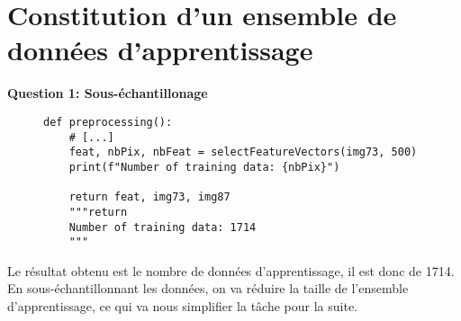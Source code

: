 \section{Constitution d’un ensemble de données d’apprentissage}

\textbf{Question 1: Sous-échantillonage}

\begin{figure}[!h]
    \begin{verbatim}
def preprocessing():
    # [...]
    feat, nbPix, nbFeat = selectFeatureVectors(img73, 500)
    print(f"Number of training data: {nbPix}")
    
    return feat, img73, img87
    """return
    Number of training data: 1714 
    """
    \end{verbatim}   
\end{figure}

Le résultat obtenu est le nombre de données d'apprentissage, il est donc de 1714. En sous-échantillonnant les 
données, on va réduire la taille de l'ensemble d'apprentissage, ce qui va nous simplifier la tâche pour la suite. 


